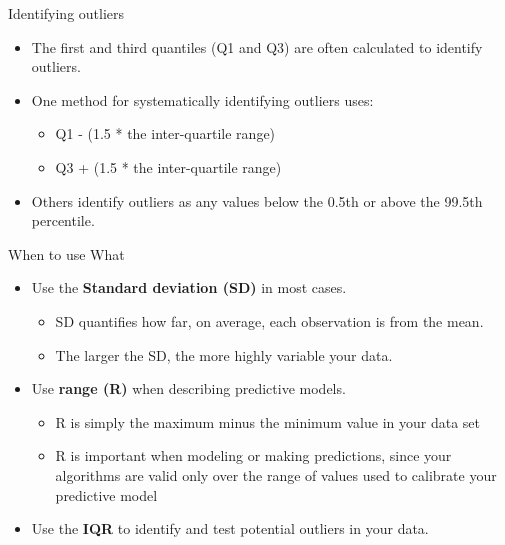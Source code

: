 \documentclass[
  ignorenonframetext,
]{beamer}
\providecommand{\tightlist}{%
  \setlength{\itemsep}{0pt}\setlength{\parskip}{0pt}}
\begin{document}
\begin{frame}{Identifying outliers}
\label{identifying-outliers-1}
\begin{itemize}
\tightlist
\item
  The first and third quantiles (Q1 and Q3) are often calculated to
  identify outliers.
\end{itemize}

\begin{itemize}
\tightlist
\item
  One method for systematically identifying outliers uses:

  \begin{itemize}
  \tightlist
  \item
    Q1 - (1.5 * the inter-quartile range)
  \item
    Q3 + (1.5 * the inter-quartile range)
  \end{itemize}
\end{itemize}

\begin{itemize}
\tightlist
\item
  Others identify outliers as any values below the 0.5th or above the
  99.5th percentile.
\end{itemize}
\end{frame}

\begin{frame}{When to use What}
\label{when-to-use-what-1}
\begin{itemize}
\tightlist
\item
  Use the \textbf{Standard deviation (SD)} in most cases.

  \begin{itemize}
  \tightlist
  \item
    SD quantifies how far, on average, each observation is from the
    mean.
  \item
    The larger the SD, the more highly variable your data.
  \end{itemize}
\end{itemize}

\begin{itemize}
\tightlist
\item
  Use \textbf{range (R)} when describing predictive models.

  \begin{itemize}
  \tightlist
  \item
    R is simply the maximum minus the minimum value in your data set
  \item
    R is important when modeling or making predictions, since your
    algorithms are valid only over the range of values used to calibrate
    your predictive model
  \end{itemize}
\end{itemize}

\begin{itemize}
\tightlist
\item
  Use the \textbf{IQR} to identify and test potential outliers in your
  data.
\end{itemize}
\end{frame}
\end{document}
